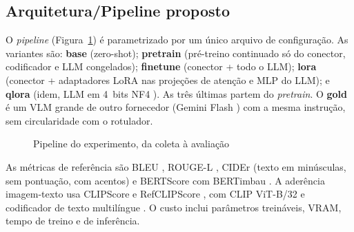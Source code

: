 \documentclass[12pt]{article}
\begin{document}
\subsection{Arquitetura/Pipeline proposto}

O \textit{pipeline} (Figura~\ref{fig:pipeline}) é parametrizado por um único
arquivo de configuração. As variantes são: \textbf{base} (zero-shot);
\textbf{pretrain} (pré-treino continuado só do conector, codificador e LLM
congelados); \textbf{finetune} (conector + todo o LLM); \textbf{lora}
(conector + adaptadores LoRA \cite{hu2022} nas projeções de atenção e MLP do
LLM); e \textbf{qlora} (idem, LLM em 4~bits NF4 \cite{dettmers2023}). As três
últimas partem do \textit{pretrain}. O \textbf{gold} é um VLM grande de outro
fornecedor (Gemini Flash \cite{gemini2023}) com a mesma instrução, sem
circularidade com o rotulador.

\begin{figure}[ht]
\centering
{}
\caption{Pipeline do experimento, da coleta à avaliação}
\label{fig:pipeline}
\end{figure}

As métricas de referência são BLEU \cite{papineni2002}, ROUGE-L
\cite{lin2004}, CIDEr \cite{vedantam2015} (texto em minúsculas, sem
pontuação, com acentos) e BERTScore \cite{zhang2020} com BERTimbau
\cite{souza2020}. A aderência imagem-texto usa CLIPScore e RefCLIPScore
\cite{hessel2021}, com CLIP ViT-B/32 \cite{radford2021} e codificador de
texto multilíngue \cite{reimers2020}. O custo inclui parâmetros treináveis,
VRAM, tempo de treino e de inferência.
\end{document}
